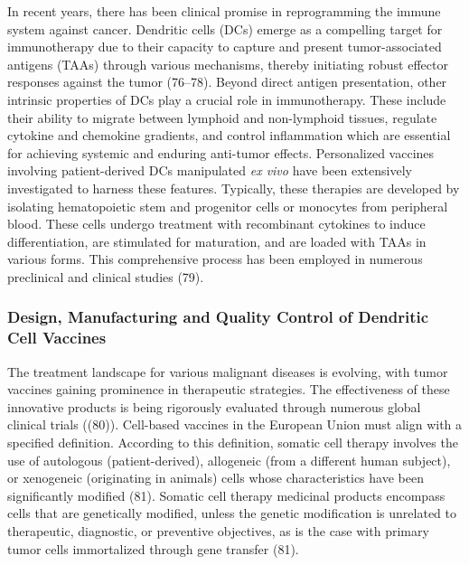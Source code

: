 \documentclass[
]{article}
\begin{document}
In recent years, there has been clinical promise in reprogramming the
immune system against cancer. Dendritic cells (DCs) emerge as a
compelling target for immunotherapy due to their capacity to capture and
present tumor-associated antigens (TAAs) through various mechanisms,
thereby initiating robust effector responses against the tumor (76--78).
Beyond direct antigen presentation, other intrinsic properties of DCs
play a crucial role in immunotherapy. These include their ability to
migrate between lymphoid and non-lymphoid tissues, regulate cytokine and
chemokine gradients, and control inflammation which are essential for
achieving systemic and enduring anti-tumor effects. Personalized
vaccines involving patient-derived DCs manipulated \emph{ex vivo} have
been extensively investigated to harness these features. Typically,
these therapies are developed by isolating hematopoietic stem and
progenitor cells or monocytes from peripheral blood. These cells undergo
treatment with recombinant cytokines to induce differentiation, are
stimulated for maturation, and are loaded with TAAs in various forms.
This comprehensive process has been employed in numerous preclinical and
clinical studies (79).

\subsubsection{Design, Manufacturing and Quality Control of Dendritic
Cell
Vaccines}\label{design-manufacturing-and-quality-control-of-dendritic-cell-vaccines}

The treatment landscape for various malignant diseases is evolving, with
tumor vaccines gaining prominence in therapeutic strategies. The
effectiveness of these innovative products is being rigorously evaluated
through numerous global clinical trials ((80)). Cell-based vaccines in
the European Union must align with a specified definition. According to
this definition, somatic cell therapy involves the use of autologous
(patient-derived), allogeneic (from a different human subject), or
xenogeneic (originating in animals) cells whose characteristics have
been significantly modified (81). Somatic cell therapy medicinal
products encompass cells that are genetically modified, unless the
genetic modification is unrelated to therapeutic, diagnostic, or
preventive objectives, as is the case with primary tumor cells
immortalized through gene transfer (81).
\end{document}
